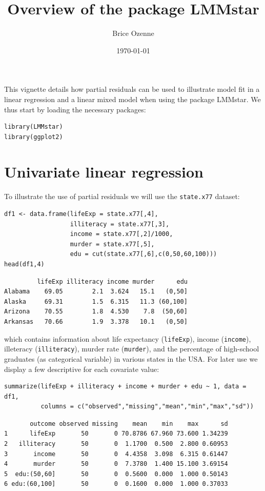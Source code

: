 \documentclass[12pt]{article}
\author{Brice Ozenne}
\date{\today}
\title{Overview of the package LMMstar}
\begin{document}
\maketitle
This vignette details how partial residuals can be used to illustrate
model fit in a linear regression and a linear mixed model when using
the package LMMstar. We thus start by loading the necessary packages:
\lstset{language=r,label= ,caption= ,captionpos=b,numbers=none}
\begin{lstlisting}
library(LMMstar)
library(ggplot2)
\end{lstlisting}


\section{Univariate linear regression}
\label{sec:orgeddb687}

To illustrate the use of partial residuals we will use the \texttt{state.x77}
dataset:
\lstset{language=r,label= ,caption= ,captionpos=b,numbers=none}
\begin{lstlisting}
df1 <- data.frame(lifeExp = state.x77[,4],
                  illiteracy = state.x77[,3],
                  income = state.x77[,2]/1000,
                  murder = state.x77[,5],
                  edu = cut(state.x77[,6],c(0,50,60,100)))
head(df1,4)
\end{lstlisting}

\begin{verbatim}
         lifeExp illiteracy income murder      edu
Alabama    69.05        2.1  3.624   15.1   (0,50]
Alaska     69.31        1.5  6.315   11.3 (60,100]
Arizona    70.55        1.8  4.530    7.8  (50,60]
Arkansas   70.66        1.9  3.378   10.1   (0,50]
\end{verbatim}


 which contains information about life expectancy (\texttt{lifeExp}), income
(\texttt{income}), illeteracy (\texttt{illiteracy}), murder rate (\texttt{murder}), and the
percentage of high-school graduates (as categorical variable) in
various states in the USA. For later use we display a few descriptive
for each covariate value:
\lstset{language=r,label= ,caption= ,captionpos=b,numbers=none}
\begin{lstlisting}
summarize(lifeExp + illiteracy + income + murder + edu ~ 1, data = df1,
          columns = c("observed","missing","mean","min","max","sd"))
\end{lstlisting}

\begin{verbatim}
       outcome observed missing    mean    min    max      sd
1      lifeExp       50       0 70.8786 67.960 73.600 1.34239
2   illiteracy       50       0  1.1700  0.500  2.800 0.60953
3       income       50       0  4.4358  3.098  6.315 0.61447
4       murder       50       0  7.3780  1.400 15.100 3.69154
5  edu:(50,60]       50       0  0.5600  0.000  1.000 0.50143
6 edu:(60,100]       50       0  0.1600  0.000  1.000 0.37033
\end{verbatim}
\end{document}
